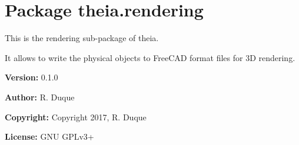 %
%
%


\section{Package theia.rendering}

    \label{theia:rendering}
This is the rendering sub-package of theia.

It allows to write the physical objects to FreeCAD format files for 3D 
rendering.

\textbf{Version:} 0.1.0



\textbf{Author:} R. Duque



\textbf{Copyright:} Copyright 2017, R. Duque



\textbf{License:} GNU GPLv3+



